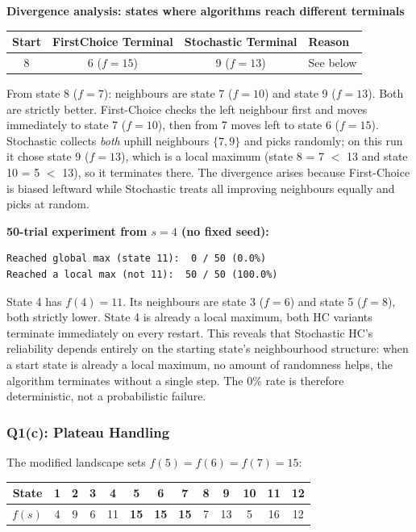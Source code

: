 \documentclass[12pt,a4paper]{article}
\begin{document}
\textbf{Divergence analysis: states where algorithms reach different terminals}

\begin{center}
\begin{tabular}{cccl}
\toprule
Start & FirstChoice Terminal & Stochastic Terminal & Reason \\
\midrule
8 & 6 ($f=15$) & 9 ($f=13$) & See below \\
\bottomrule
\end{tabular}
\end{center}

From state 8 ($f=7$): neighbours are state 7 ($f=10$) and state 9 ($f=13$).
Both are strictly better. First-Choice checks the left neighbour first and
moves immediately to state 7 ($f=10$), then from 7 moves left to state 6 ($f=15$).
Stochastic collects \emph{both} uphill neighbours $\{7, 9\}$ and picks randomly;
on this run it chose state 9 ($f=13$), which is a local maximum
(state 8 = 7 $<$ 13 and state 10 = 5 $<$ 13), so it terminates there.
The divergence arises because First-Choice is biased leftward while
Stochastic treats all improving neighbours equally and picks at random.

\textbf{50-trial experiment from $s=4$ (no fixed seed):}

\begin{lstlisting}[style=output]
Reached global max (state 11):  0 / 50 (0.0%)
Reached a local max (not 11):  50 / 50 (100.0%)
\end{lstlisting}

State 4 has $f(4)=11$. Its neighbours are state 3 ($f=6$) and state 5 ($f=8$),
both strictly lower. State 4 is already a local maximum, both HC variants
terminate immediately on every restart. This reveals that Stochastic HC's
reliability depends entirely on the starting state's neighbourhood structure:
when a start state is already a local maximum, no amount of randomness helps, the algorithm terminates without a single step. The 0\% rate is therefore deterministic, not a probabilistic failure.

\subsubsection*{Q1(c): Plateau Handling}

The modified landscape sets $f(5)=f(6)=f(7)=15$:

\begin{center}
\begin{tabular}{ccccccccccccc}
\toprule
State & 1 & 2 & 3 & 4 & 5 & 6 & 7 & 8 & 9 & 10 & 11 & 12 \\
\midrule
$f(s)$ & 4 & 9 & 6 & 11 & \textbf{15} & \textbf{15} & \textbf{15} & 7 & 13 & 5 & 16 & 12 \\
\bottomrule
\end{tabular}
\end{center}
\end{document}
